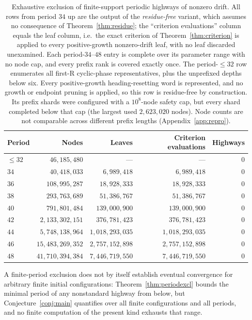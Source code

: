 \documentclass[11pt,reqno]{amsart}
\theoremstyle{plain}
\theoremstyle{definition}
\newcommand{\turnR}{\mathrm{R}}
\begin{document}
\begin{table}[ht]
\centering
\begin{tabular}{@{}lrrrr@{}}
\toprule
Period & Nodes & Leaves & Criterion evaluations & Highways \\
\midrule
$\le 32$ & $46{,}185{,}480$ & --- & --- & $0$\\
$34$ & $40{,}418{,}033$      & $6{,}989{,}418$      & $6{,}989{,}418$      & $0$\\
$36$ & $108{,}995{,}287$     & $18{,}928{,}333$     & $18{,}928{,}333$     & $0$\\
$38$ & $293{,}763{,}689$     & $51{,}386{,}767$     & $51{,}386{,}767$     & $0$\\
$40$ & $791{,}801{,}484$     & $139{,}000{,}900$    & $139{,}000{,}900$    & $0$\\
$42$ & $2{,}133{,}302{,}151$ & $376{,}781{,}423$    & $376{,}781{,}423$    & $0$\\
$44$ & $5{,}748{,}138{,}964$ & $1{,}018{,}293{,}035$& $1{,}018{,}293{,}035$& $0$\\
$46$ & $15{,}483{,}269{,}352$& $2{,}757{,}152{,}898$& $2{,}757{,}152{,}898$& $0$\\
$48$ & $41{,}710{,}394{,}384$& $7{,}446{,}719{,}550$& $7{,}446{,}719{,}550$& $0$\\
\bottomrule
\end{tabular}
\caption{Exhaustive exclusion of finite-support periodic highways of nonzero drift.
All rows from period $34$ up are the output of the \emph{residue-free} variant, which
assumes no consequence of Theorem~\ref{thm:residue}; the ``criterion evaluations''
column equals the leaf column, i.e.\ the exact criterion of
Theorem~\ref{thm:criterion} is applied to every positive-growth nonzero-drift leaf,
with no leaf discarded unexamined. Each period-$34$--$48$ entry is complete over its
parameter range with no node cap, and every prefix rank is covered exactly once. The
period-$\le32$ row enumerates all first-$\turnR$ cyclic-phase representatives, plus
the unprefixed depths below six. Every positive-growth heading-resetting word is
represented, and no growth or endpoint pruning is applied, so this row is
residue-free by construction. Its prefix shards were configured with a
$10^8$-node safety cap, but every shard completed below that cap (the largest used
$2{,}623{,}020$ nodes). Node counts are not comparable across different prefix
lengths (Appendix~\ref{app:repro}).}
\label{tab:excl}
\end{table}

A finite-period exclusion does not by itself establish eventual convergence for
arbitrary finite initial configurations: Theorem~\ref{thm:periodexcl} bounds the
minimal period of any nonstandard highway from below, but Conjecture~\ref{conj:main}
quantifies over all finite configurations and all periods, and no finite computation
of the present kind exhausts that range.
\end{document}

